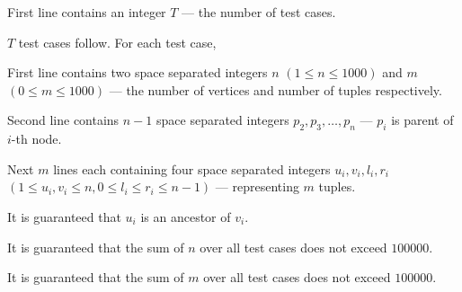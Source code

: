 First line contains an integer $T$ --- the number of test cases.

$T$ test cases follow. For each test case,

First line contains two space separated integers $n$ $(1 \leq n \leq 1000 )$ and $m$ $(0 \leq m \leq 1000)$ --- the number of vertices and number of tuples respectively.

Second line contains $n-1$ space separated integers $p_2, p_3, \ldots, p_n$ --- $p_i$ is parent of $i$-th node.

Next $m$ lines each containing four space separated integers $u_i, v_i, l_i, r_i$ $(1 \leq u_i, v_i \leq n, 0 \leq l_i \leq r_i \leq n-1)$ --- representing $m$ tuples.

It is guaranteed that $u_i$ is an ancestor of $v_i$.

It is guaranteed that the sum of $n$ over all test cases does not exceed $100000$.

It is guaranteed that the sum of $m$ over all test cases does not exceed $100000$.
